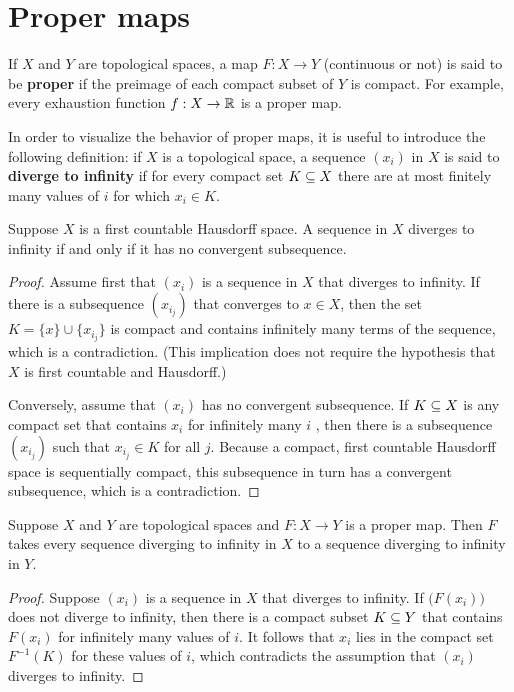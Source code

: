 \section{Proper maps}
If $X$ and $Y$ are topological spaces, a map $F:X\to Y$ (continuous or not) is said to be \textbf{proper} if the preimage of each compact subset of $Y$ is compact. For example, every exhaustion function $f:X\to\mathbb{R}$ is a proper map.\par
In order to visualize the behavior of proper maps, it is useful to introduce the following definition: if $X$ is a topological space, a sequence $(x_i)$ in $X$ is said to \textbf{diverge to infinity} if for every compact set $K\subseteq X$ there are at most finitely many values of $i$ for which $x_i\in K$.
\begin{lemma}\label{diverge iff no conv}
Suppose $X$ is a first countable Hausdorff space. A sequence in $X$ diverges to infinity if and only if it has no convergent subsequence.
\end{lemma}
\begin{proof}
Assume first that $(x_i)$ is a sequence in $X$ that diverges to infinity. If there is a subsequence $(x_{i_j})$ that converges to $x\in X$, then the set $K=\{x\}\cup\{x_{i_j}\}$ is compact and contains infinitely many terms of the sequence, which is a contradiction. (This implication does not require the hypothesis that $X$ is first countable and Hausdorff.)\par
Conversely, assume that $(x_i)$ has no convergent subsequence. If $K\subseteq X$ is any compact set that contains $x_i$ for infinitely many $i$ , then there is a subsequence $(x_{i_j})$ such that $x_{i_j}\in K$ for all $j$. Because a compact, first countable Hausdorff space is sequentially compact, this subsequence in turn has a convergent subsequence, which is a contradiction.
\end{proof}
\begin{proposition}
Suppose $X$ and $Y$ are topological spaces and $F:X\to Y$ is a proper map. Then $F$ takes every sequence diverging to infinity in $X$ to a sequence diverging to infinity in $Y$.
\end{proposition}
\begin{proof}
Suppose $(x_i)$ is a sequence in $X$ that diverges to infinity. If $\big(F(x_i)\big)$ does not diverge to infinity, then there is a compact subset $K\subseteq Y$ that contains $F(x_i)$ for infinitely many values of $i$. It follows that $x_i$ lies in the compact set $F^{-1}(K)$ for these values of $i$, which contradicts the assumption that $(x_i)$ diverges to infinity.
\end{proof}
